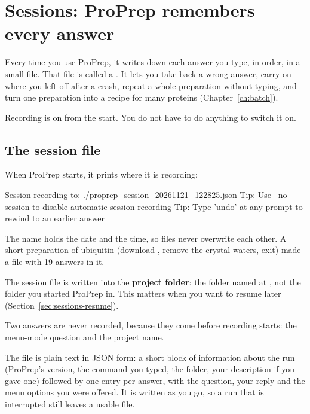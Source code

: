 \chapter{Sessions: ProPrep remembers every answer}
\label{ch:sessions}

Every time you use ProPrep, it writes down each answer you type, in order, in
a small file. That file is called a . It lets you take back a
wrong answer, carry on where you left off after a crash, repeat a whole
preparation without typing, and turn one preparation into a recipe for many
proteins (Chapter~\ref{ch:batch}).

Recording is on from the start. You do not have to do anything to switch it
on.

\section{The session file}
\label{sec:sessions-file}

When ProPrep starts, it prints where it is recording:

\begin{screen}
Session recording to: ./proprep_session_20261121_122825.json
Tip: Use --no-session to disable automatic session recording
Tip: Type 'undo' at any prompt to rewind to an earlier answer
\end{screen}

The name holds the date and the time, so files never overwrite each other. A
short preparation of ubiquitin (download , remove the crystal
waters, exit) made a file with 19 answers in it.

\begin{watchout}
The session file is written into the \textbf{project folder}: the folder named
at , not the folder you started ProPrep in. This matters
when you want to resume later (Section~\ref{sec:sessions-resume}).
\end{watchout}

Two answers are never recorded, because they come before recording starts: the
menu-mode question and the project name.

\begin{behindscenes}
The file is plain text in JSON form: a short block of information about the
run (ProPrep's version, the command you typed, the folder, your description if
you gave one) followed by one entry per answer, with the question, your reply
and the menu options you were offered. It is written as you go, so a run that
is interrupted still leaves a usable file.
\end{behindscenes}

